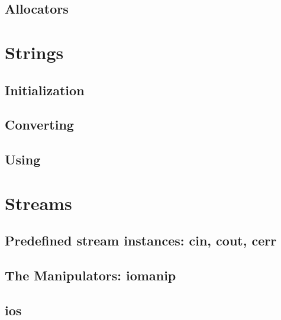 \documentclass[11pt,a4paper]{article}
\begin{document}
\subsection{Allocators}

\newpage
\section{Strings}
\subsection{Initialization}
\subsection{Converting}
\subsection{Using}

\newpage
\section{Streams}
\subsection{Predefined stream instances: cin, cout, cerr}
\subsection{The Manipulators: iomanip}
\subsection{ios}
\end{document}
